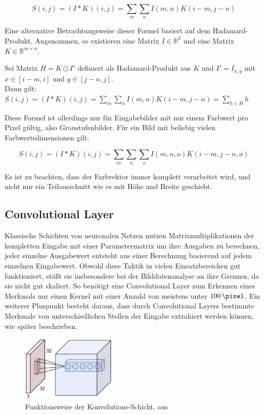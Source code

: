 \begin{equation}
S(i,j) = (I*K)(i,j) = \sum_{m}\sum_{n}I(m,n)K(i-m,j-n)
\end{equation}

Eine alternative Betrachtungsweise dieser Formel basiert auf dem Hadamard-Produkt. Angenommen, es existieren eine Matrix $I\in\mathbb{R}^{2}$ und eine Matrix $K\in\mathbb{R}^{m\times n}$.

Sei Matrix $H = K\odot I'$ definiert als Hadamard-Produkt aus $K$ und $I'=I_{x, y}$ mit $x\in[i-m,i]$ und $y\in[j-n,j]$.\\
Dann gilt: $S(i,j)=(I*K)(i,j) = \sum_{m}\sum_{n}I(m,n)K(i-m,j-n)=\sum_{h\in H}h$

Diese Formel ist allerdings nur für Eingabebilder mit nur einem Farbwert pro Pixel gültig, also Graustufenbilder. Für ein Bild mit beliebig vielen Farbwertsdimensionen gilt:

\begin{equation}
S(i,j) = (I*K)(i,j) = \sum_{m}\sum_{n}\sum_{o}I(m,n,o)K(i-m,j-n,o)
\end{equation}

Es ist zu beachten, dass der Farbvektor immer komplett verarbeitet wird, und nicht nur ein Teilausschnitt wie es mit Höhe und Breite geschieht.

\subsection{Convolutional Layer}
\label{ssec:convolutional_layer}

Klassische Schichten von neuronalen Netzen nutzen Matrixmultiplikationen der kompletten Eingabe mit einer Parametermatrix um ihre Ausgaben zu berechnen, \dahe jeder einzelne Ausgabewert entsteht aus einer Berechnung basierend auf jedem einzelnen Eingabewert. Obwohl diese Taktik in vielen Einsatzbereichen gut funktioniert, stößt sie insbesondere bei der Bilddatenanalyse an ihre Grenzen, da sie nicht gut skaliert. \cite{cs231n} So benötigt eine Convolutional Layer zum Erkennen eines Merkmals nur einen Kernel mit einer Anzahl von meistens unter $\SI{100}{\pixel}$. \cite{deeplearning_16} Ein weiterer Pluspunkt besteht daraus, dass durch Convolutional Layers bestimmte Merkmale von unterschiedlichen Stellen der Eingabe extrahiert werden können, wie später beschrieben.

\begin{figure}[H]
	\centering
	\includegraphics[width=0.4\textwidth,keepaspectratio]{images/LJY19/convolutional.jpg}
	\caption{Funktionsweise der Konvolutions-Schicht, aus \cite{cs231n}}
	\label{fig:convolutional}
\end{figure}

